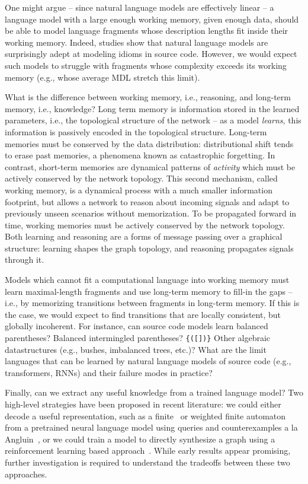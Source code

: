 \documentclass[12pt]{article}
\begin{document}
One might argue -- since natural language models are effectively linear -- a language model with a large enough working memory, given enough data, should be able to model language fragments whose description lengths fit inside their working memory. Indeed, studies show that natural language models are surprisingly adept at modeling idioms in source code. However, we would expect such models to struggle with fragments whose complexity exceeds its working memory (e.g., whose average MDL stretch this limit).

What is the difference between working memory, i.e., reasoning, and long-term memory, i.e., knowledge? Long term memory is information stored in the learned parameters, i.e., the topological structure of the network -- as a model \textit{learns}, this information is passively encoded in the topological structure. Long-term memories must be conserved by the data distribution: distributional shift tends to erase past memories, a phenomena known as catastrophic forgetting. In contrast, short-term memories are dynamical patterns of \textit{activity} which must be actively conserved by the network topology. This second mechanism, called working memory, is a dynamical process with a much smaller information footprint, but allows a network to reason about incoming signals and adapt to previously unseen scenarios without memorization. To be propagated forward in time, working memories must be actively conserved by the network topology. Both learning and reasoning are a forms of message passing over a graphical structure: learning shapes the graph topology, and reasoning propagates signals through it.

Models which cannot fit a computational language into working memory must learn maximal-length fragments and use long-term memory to fill-in the gaps -- i.e., by memorizing transitions between fragments in long-term memory. If this is the case, we would expect to find transitions that are locally consistent, but globally incoherent. For instance, can source code models learn balanced parentheses? Balanced intermingled parentheses? \texttt{\{([])\}} Other algebraic datastructures (e.g., bushes, imbalanced trees, etc.)? What are the limit languages that can be learned by natural language models of source code (e.g., transformers, RNNs) and their failure modes in practice?

Finally, can we extract any useful knowledge from a trained language model? Two high-level strategies have been proposed in recent literature: we could either decode a useful representation, such as a finite~\cite{weiss2018extracting} or weighted finite automaton~\cite{weiss2019learning} from a pretrained neural language model using queries and counterexamples a la Angluin~\cite{angluin1987learning}, or we could train a model to directly synthesize a graph using a reinforcement learning based approach~\cite{johnson2020learning}. While early results appear promising, further investigation is required to understand the tradeoffs between these two approaches.
\end{document}
